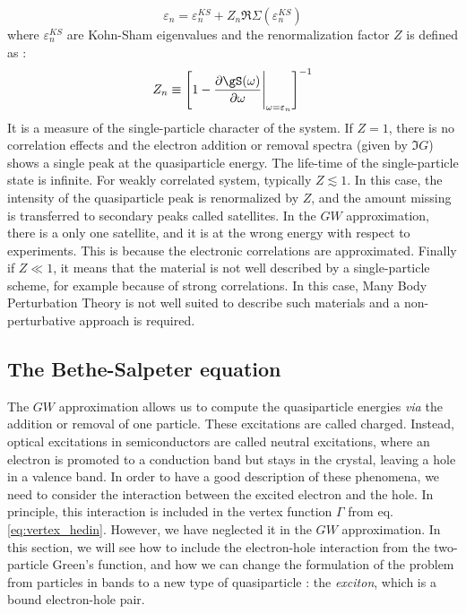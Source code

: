 \begin{equation}
	\varepsilon_n = \varepsilon^{KS}_n + Z_n\Re\Sigma(\varepsilon^{KS}_n)
\end{equation} 
where $\varepsilon^{KS}_n$ are Kohn-Sham eigenvalues and the renormalization factor $Z$ is defined as :
\begin{equation}
	Z_n \equiv \left[ 1 - \frac{\partial \gS(\omega)}{\partial \omega} \Biggr|_{\omega = \varepsilon_n} \right]^{-1}
\end{equation}
It is a measure of the single-particle character of the system. If $Z=1$, there is no correlation effects and the electron addition or removal spectra (given by $\Im G$) shows a single peak at the quasiparticle energy. The life-time of the single-particle state is infinite. For weakly correlated system, typically $Z \lesssim 1$. In this case, the intensity of the quasiparticle peak is renormalized by $Z$, and the amount missing is transferred to secondary peaks called satellites. In the $GW$ approximation, there is a only one satellite, and it is at the wrong energy with respect to experiments.\cite{PhysRevLett.107.166401} This is because the electronic correlations are approximated. Finally if $Z \ll 1$, it means that the material is not well described by a single-particle scheme, for example because of strong correlations. In this case, Many Body Perturbation Theory is not well suited to describe such materials and a non-perturbative approach is required.


\subsection{The Bethe-Salpeter equation}

The $GW$ approximation allows us to compute the quasiparticle energies \textit{via} the addition or removal of one particle. These excitations are called charged. Instead, optical excitations in semiconductors are called neutral excitations, where an electron is promoted to a conduction band but stays in the crystal, leaving a hole in a valence band. In order to have a good description of these phenomena, we need to consider the interaction between the excited electron and the hole. In principle, this interaction is included in the vertex function $\Gamma$ from eq. \eqref{eq:vertex_hedin}. However, we have neglected it in the $GW$ approximation. In this section, we will see how to include the electron-hole interaction from the two-particle Green's function, and how we can change the formulation of the problem from particles in bands to a new type of quasiparticle : the \textit{exciton}, which is a bound electron-hole pair.

